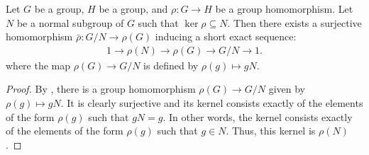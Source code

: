 \begin{lemma} \label{lemma:short_exact_sequence_of_groups_yields_short_exact_sequences_of_images_under_a_group_homomorphism_whose_kernel_contains_the_normal_subgroup}
    Let $G$ be a group, $H$ be a group, and $\rho: G \to H$ be a group homomorphism. Let $N$ be a normal subgroup of $G$ such that $\ker \rho \subseteq N$. Then there exists a surjective homomorphism $\bar{\rho}: G/N \to \rho(G)$ inducing a short exact sequence:
    \begin{align*}
        1 \to \rho(N) \to \rho(G) \to G/N \to 1.
    \end{align*}
    where the map $\rho(G) \to G/N$ is defined by $\rho(g) \mapsto gN$. 
\end{lemma}

\begin{proof}
    By , there is a group homomorphism $\rho(G) \to G/N$ given by $\rho(g) \mapsto gN$. It is clearly surjective and its kernel consists exactly of the elements of the form $\rho(g)$ such that $gN = g$. In other words, the kernel consists exactly of the elements of the form $\rho(g)$ such that $g \in N$. Thus, this kernel is $\rho(N)$.
\end{proof}